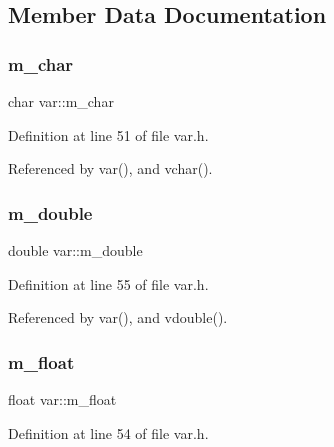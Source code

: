 \subsection{Member Data Documentation}
\mbox{\label{classvar_afffb29be23233ae232502023719da1d3}} 
\subsubsection{\texorpdfstring{m\+\_\+char}{m\_char}}
{\footnotesize\ttfamily char var\+::m\+\_\+char\hspace{0.3cm}{\ttfamily [private]}}



Definition at line 51 of file var.\+h.



Referenced by var(), and vchar().

\mbox{\label{classvar_ad8590162a1dae61824b874c615cce311}} 
\subsubsection{\texorpdfstring{m\+\_\+double}{m\_double}}
{\footnotesize\ttfamily double var\+::m\+\_\+double\hspace{0.3cm}{\ttfamily [private]}}



Definition at line 55 of file var.\+h.



Referenced by var(), and vdouble().

\mbox{\label{classvar_adb803c54ed2edb812a77241d511385e6}} 
\subsubsection{\texorpdfstring{m\+\_\+float}{m\_float}}
{\footnotesize\ttfamily float var\+::m\+\_\+float\hspace{0.3cm}{\ttfamily [private]}}



Definition at line 54 of file var.\+h.



